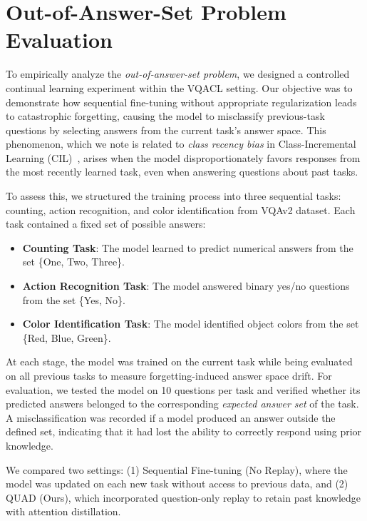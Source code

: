 \section{Out-of-Answer-Set Problem Evaluation}
\label{sec:out_of_answer_set}

To empirically analyze the \textit{out-of-answer-set problem}, we designed a controlled continual learning experiment within the VQACL setting. Our objective was to demonstrate how sequential fine-tuning without appropriate regularization leads to catastrophic forgetting, causing the model to misclassify previous-task questions by selecting answers from the current task’s answer space. This phenomenon, which we note is related to \textit{class recency bias} in Class-Incremental Learning (CIL)~\citep{rypesc2025task, mai2021supervised}, arises when the model disproportionately favors responses from the most recently learned task, even when answering questions about past tasks.

To assess this, we structured the training process into three sequential tasks: counting, action recognition, and color identification from VQAv2 dataset. Each task contained a fixed set of possible answers:
\begin{itemize}
    \item \textbf{Counting Task}: The model learned to predict numerical answers from the set \{One, Two, Three\}.
    \item \textbf{Action Recognition Task}: The model answered binary yes/no questions from the set \{Yes, No\}.
    \item \textbf{Color Identification Task}: The model identified object colors from the set \{Red, Blue, Green\}.
\end{itemize}

At each stage, the model was trained on the current task while being evaluated on all previous tasks to measure forgetting-induced answer space drift. For evaluation, we tested the model on 10 questions per task and verified whether its predicted answers belonged to the corresponding \textit{expected answer set} of the task. A misclassification was recorded if a model produced an answer outside the defined set, indicating that it had lost the ability to correctly respond using prior knowledge.

We compared two settings: (1) Sequential Fine-tuning (No Replay), where the model was updated on each new task without access to previous data, and (2) QUAD (Ours), which incorporated question-only replay to retain past knowledge with attention distillation. 

